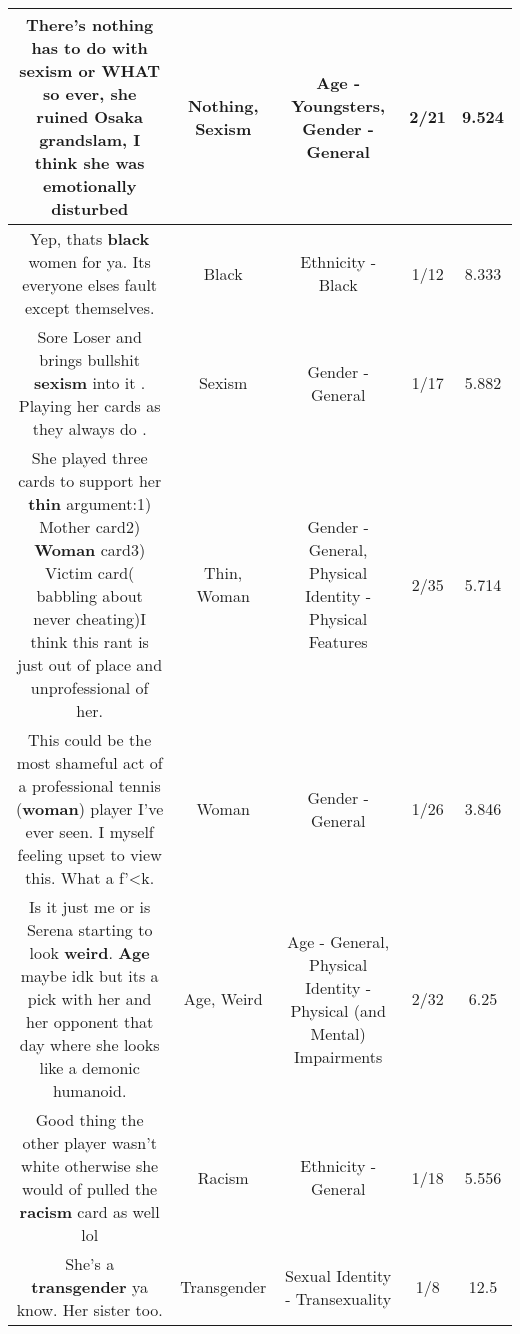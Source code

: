 \documentclass[11pt]{article}
\newlength\mylength
\begin{document}
\begin{center}
\begin{longtable}{|C{.65\mylength}|C{.30\mylength}|C{.12\mylength}|C{.12\mylength}|C{.12\mylength}|}
  \small There's \textbf{nothing} has to do with \textbf{sexism} or WHAT so ever, she ruined Osaka grandslam, I think she was emotionally disturbed\normalsize   & Nothing, Sexism & Age - Youngsters, Gender - General & 2/21 & 9.524 \\  \hline
  \small Yep, thats \textbf{black} women for ya. Its everyone elses fault except themselves.\normalsize   & Black & Ethnicity - Black & 1/12 & 8.333 \\  \hline
  \small Sore Loser and brings bullshit \textbf{sexism} into it . Playing her cards as they  always do .\normalsize   & Sexism & Gender - General & 1/17 & 5.882 \\  \hline
  \small She played three cards to support her \textbf{thin} argument:1) Mother card2) \textbf{Woman} card3) Victim card( babbling about never cheating)I think this rant is just out of place and unprofessional of her.\normalsize   & Thin, Woman & Gender - General, Physical Identity - Physical Features & 2/35 & 5.714 \\  \hline
  \small This could be the most shameful act of a professional tennis (\textbf{woman}) player I've ever seen.  I myself feeling upset to view this.  What a f'<k.\normalsize   & Woman & Gender - General & 1/26 & 3.846 \\  \hline
  \small Is it just me or is Serena starting to look \textbf{weird}.  \textbf{Age} maybe idk but its a pick with her and her opponent that day where she looks like a demonic humanoid.\normalsize   & Age, Weird & Age - General, Physical Identity - Physical (and Mental) Impairments & 2/32 & 6.25 \\  \hline
  \small Good thing the other player wasn't white otherwise she would of pulled the \textbf{racism} card as well lol\normalsize   & Racism & Ethnicity - General & 1/18 & 5.556 \\  \hline
  \small She's a \textbf{transgender} ya know.  Her sister too.\normalsize   & Transgender & Sexual Identity - Transexuality & 1/8 & 12.5 \\  \hline

\end{longtable}
\end{center}
\end{document}
